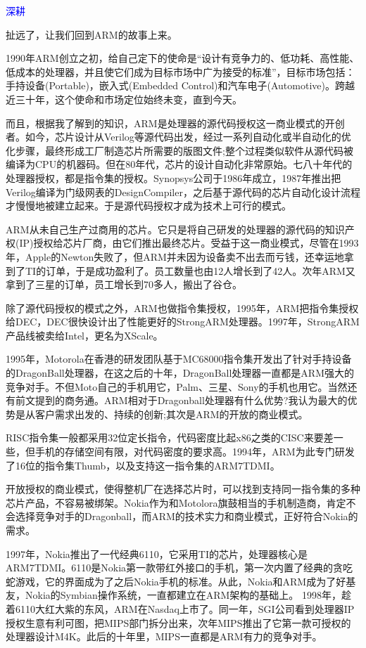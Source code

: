 \documentclass[utf8]{book}
\begin{document}
	\begin{flushleft}
		{\large \textcolor{blue}{深耕}}
	\end{flushleft}
	
	扯远了，让我们回到ARM的故事上来。
	
	1990年ARM创立之初，给自己定下的使命是“设计有竞争力的、低功耗、高性能、低成本的处理器，并且使它们成为目标市场中广为接受的标准”，目标市场包括：手持设备(Portable)，嵌入式(Embedded Control)和汽车电子(Automotive)。跨越近三十年，这个使命和市场定位始终未变，直到今天。
	
	而且，根据我了解到的知识，ARM是处理器的源代码授权这一商业模式的开创者。如今，芯片设计从Verilog等源代码出发，经过一系列自动化或半自动化的优化步骤，最终形成工厂制造芯片所需要的版图文件;整个过程类似软件从源代码被编译为CPU的机器码。但在80年代，芯片的设计自动化非常原始。七八十年代的处理器授权，都是指令集的授权。Synopsys公司于1986年成立，1987年推出把Verilog编译为门级网表的DesignCompiler，之后基于源代码的芯片自动化设计流程才慢慢地被建立起来。于是源代码授权才成为技术上可行的模式。
	
	ARM从未自己生产过商用的芯片。它只是将自己研发的处理器的源代码的知识产权(IP)授权给芯片厂商，由它们推出最终芯片。受益于这一商业模式，尽管在1993年，Apple的Newton失败了，但ARM并未因为设备卖不出去而亏钱，还幸运地拿到了TI的订单，于是成功盈利了。员工数量也由12人增长到了42人。次年ARM又拿到了三星的订单，员工增长到70多人，搬出了谷仓。
	
	除了源代码授权的模式之外，ARM也做指令集授权，1995年，ARM把指令集授权给DEC，DEC很快设计出了性能更好的StrongARM处理器。1997年，StrongARM产品线被卖给Intel，更名为XScale。
	
	1995年，Motorola在香港的研发团队基于MC68000指令集开发出了针对手持设备的DragonBall处理器，在这之后的十年，DragonBall处理器一直都是ARM强大的竞争对手。不但Moto自己的手机用它，Palm、三星、Sony的手机也用它。当然还有前文提到的商务通。ARM相对于Dragonball处理器有什么优势?我认为最大的优势是从客户需求出发的、持续的创新;其次是ARM的开放的商业模式。
	
	RISC指令集一般都采用32位定长指令，代码密度比起x86之类的CISC来要差一些，但手机的存储空间有限，对代码密度的要求高。1994年，ARM为此专门研发了16位的指令集Thumb，以及支持这一指令集的ARM7TDMI。
	
	开放授权的商业模式，使得整机厂在选择芯片时，可以找到支持同一指令集的多种芯片产品，不容易被绑架。Nokia作为和Motolora旗鼓相当的手机制造商，肯定不会选择竞争对手的Dragonball，而ARM的技术实力和商业模式，正好符合Nokia的需求。
	
	1997年，Nokia推出了一代经典6110，它采用TI的芯片，处理器核心是ARM7TDMI。6110是Nokia第一款带红外接口的手机，第一次内置了经典的贪吃蛇游戏，它的界面成为了之后Nokia手机的标准。从此，Nokia和ARM成为了好基友，Nokia的Symbian操作系统，一直都建立在ARM架构的基础上。
	1998年，趁着6110大红大紫的东风，ARM在Nasdaq上市了。同一年，SGI公司看到处理器IP授权生意有利可图，把MIPS部门拆分出来，次年MIPS推出了它第一款可授权的处理器设计M4K。此后的十年里，MIPS一直都是ARM有力的竞争对手。
	
\end{document}
